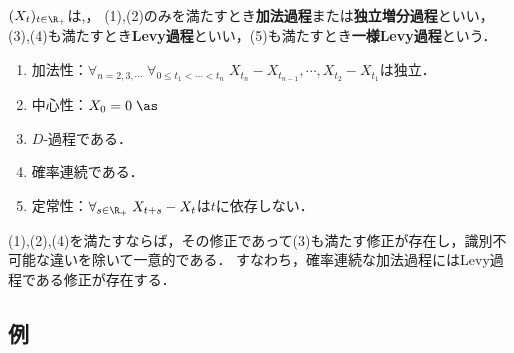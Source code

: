 \documentclass[uplatex,dvipdfmx]{jsreport}
\begin{document}
\begin{definition}
    $(X_t)_{t\in\R_+}$は,，
    (1),(2)のみを満たすとき\textbf{加法過程}または\textbf{独立増分過程}といい，
    (3),(4)も満たすとき\textbf{Levy過程}といい，(5)も満たすとき\textbf{一様Levy過程}という．
    \begin{enumerate}
        \item 加法性：$\forall_{n=2,3,\cdots}\;\forall_{0\le t_1<\cdots<t_n}\;X_{t_n}-X_{t_{n-1}},\cdots,X_{t_2}-X_{t_1}$は独立．
        \item 中心性：$X_0=0\;\as$
        \item $D$-過程である．
        \item 確率連続である．
        \item 定常性：$\forall_{s\in\R_+}\;X_{t+s}- X_t$は$t$に依存しない．
    \end{enumerate}
\end{definition}

\begin{theorem}[確率連続な加法過程にはLevy過程である修正が存在する]
    (1),(2),(4)を満たすならば，その修正であって(3)も満たす修正が存在し，識別不可能な違いを除いて一意的である．
    すなわち，確率連続な加法過程にはLevy過程である修正が存在する．
\end{theorem}

\subsection{例}
\end{document}
